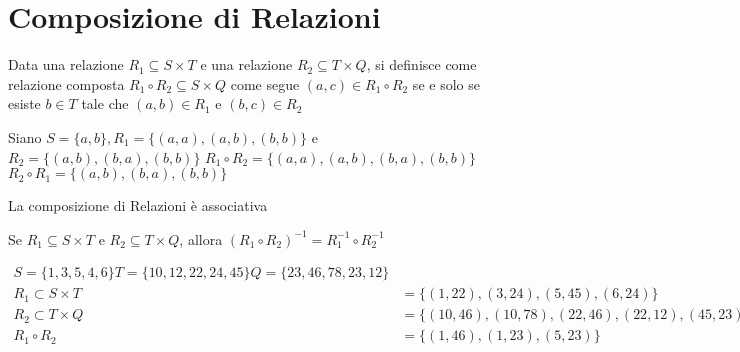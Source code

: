\section{Composizione di Relazioni}
Data una relazione $R_1 \subseteq S \times T$ e una relazione $R_2 \subseteq T \times Q$,
si definisce come relazione composta $R_1 \circ R_2 \subseteq S \times Q$ come segue
$(a,c) \in R_1 \circ R_2$ se e solo se  esiste $b \in T$ tale che $(a,b) \in R_1$ e $(b,c) \in R_2$

Siano $S = \{ a,b \}, R_1 = \{ (a,a),(a,b),(b,b) \}$ e $R_2 = \{ (a,b),(b,a),(b,b) \}$
$R_1 \circ R_2 = \{ (a,a),(a,b),(b,a),(b,b) \}$ \newline
$R_2 \circ R_1 = \{ (a,b),(b,a),(b,b) \}$

\begin{prop}
La composizione di Relazioni è associativa
\end{prop}

\begin{thm}
Se $R_1 \subseteq S \times T$ e $R_2 \subseteq T \times Q$, allora $(R_1 \circ R_2)^{-1} = R_1^{-1} \circ R_2^{-1}$
\end{thm}


\begin{equation*}
\begin{split}
S = \{ 1,3,5,4,6\} T = \{10,12,22,24,45\} Q = \{23,46,78,23,12\} \\
R_1 \subset S \times T & = \{(1,22),(3,24),(5,45),(6,24)\} \\
R_2 \subset T \times Q & = \{(10,46),(10,78),(22,46),(22,12),(45,23)\} \\
R_1 \circ R_2 & = \{(1,46),(1,23),(5,23)\} \\
\end{split}
\end{equation*}
